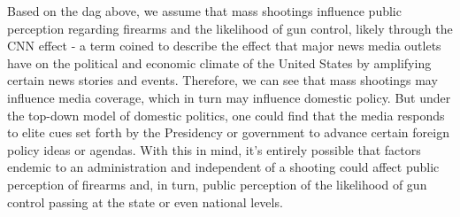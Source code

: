 \documentclass[9pt,twocolumn,twoside,lineno]{pnas-new}
\begin{document}
Based on the dag above, we assume that mass shootings influence public perception regarding firearms and the likelihood of gun control, likely through the CNN effect - a term coined to describe the effect that major news media outlets have on the political and economic climate of the United States by amplifying certain news stories and events. Therefore, we can see that mass shootings may influence media coverage, which in turn may influence domestic policy. But under the top-down model of domestic politics, one could find that the media responds to elite cues set forth by the Presidency or government to advance certain foreign policy ideas or agendas. With this in mind, it's entirely possible that factors endemic to an administration and independent of a shooting could affect public perception of firearms and, in turn, public perception of the likelihood of gun control passing at the state or even national levels. 

\showacknow{} %


\end{document}
